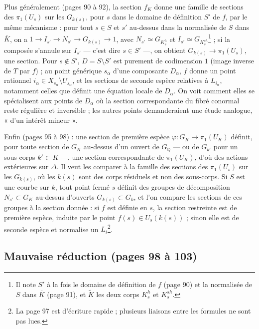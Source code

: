 \documentclass[11pt,a4paper]{article}
\begin{document}
Plus généralement (pages 90 à 92), la section $f_K$ donne une famille de
sections des $\pi_1(U_s)$ sur les $G_{k(s)}$, pour $s$ dans le domaine de
définition $S'$ de $f$, par le même mécanisme : pour tout $s \in S$ et $s'$
au-dessus dans la normalisée de $S$ dans $\overline{K}$, on a $1 \to I_{s'} \to
N_{s'} \to G_{k(s)} \to 1$, avec $N_{s'} \simeq G_{K^h_s}$ et $I_{s'} \simeq
G_{K^{sh}_s}$\footnote{Il note $S'$ à la fois le domaine de définition de $f$
(page 90) et la normalisée de $S$ dans $\overline{K}$ (page 91), et $\tilde K$
les deux corps $K^h_s$ et $K^{sh}_s$.} ; si la composée s'annule sur
$I_{s'}$ — c'est dire $s \in S'$ —, on obtient $G_{k(s)} \to \pi_1(U_s)$, une
section. Pour $s \notin S'$, $D = S \setminus S'$ est purement de codimension
$1$ (image inverse de $T$ par $f$) ; au point générique $s_\alpha$ d'une
composante $D_\alpha$, $f$ donne un point rationnel $i_\alpha \in X_{s_\alpha}
\setminus U_{s_\alpha}$, et les sections de seconde espèce relatives à
$L_{i_\alpha}$, notamment celles que définit une équation locale de $D_\alpha$.
On voit comment elles se spécialisent aux points de $D_\alpha$ où la section
correspondante du fibré conormal reste régulière et inversible ; les autres
points demanderaient une étude analogue, « d'un intérêt mineur ».

Enfin (pages 95 à 98) : une section de première espèce $\varphi : G_K \to
\pi_1(U_K)$ définit, pour toute section de $G_K$ au-dessus d'un ouvert de
$G_{\mathbb{Q}}$ — ou de $G_{k'}$ pour un sous-corps $k' \subset K$ —, une
section correspondante de $\pi_1(U_K)$, d'où des actions extérieures sur
$\Delta$. Il veut les comparer à la famille des sections des $\pi_1(U_s)$ sur
les $G_{k(s)}$, où les $k(s)$ sont des corps résiduels et non des sous-corps.
Si $S$ est une courbe sur $k$, tout point fermé $s$ définit des groupes de
décomposition $N_{s'} \subset G_K$ au-dessus d'ouverts $G_{k(s)} \subset G_k$,
et l'on compare les sections de ces groupes à la section donnée : si $f$ est
définie en $s$, la section restreinte est de première espèce, induite par le
point $f(s) \in U_s(k(s))$ ; sinon elle est de seconde espèce et normalise un
$L_i$\footnote{La page 97 est d'écriture rapide ; plusieurs liaisons entre les
formules ne sont pas lues.}.

\subsection*{Mauvaise réduction (pages 98 à 103)}
\end{document}
